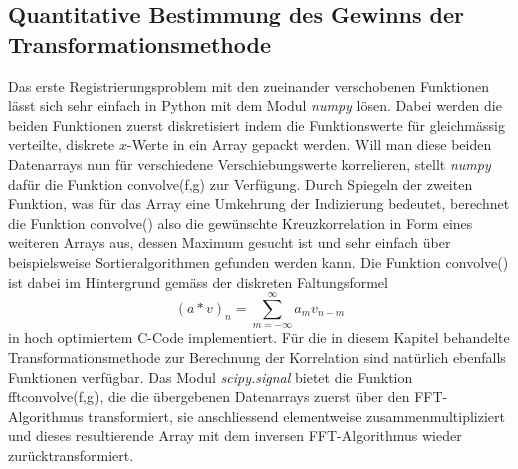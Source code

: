 \subsection{Quantitative Bestimmung des Gewinns der Transformationsmethode
\label{mellin:subsection:gewinn}}
Das erste Registrierungsproblem mit den zueinander verschobenen Funktionen 
lässt sich sehr einfach in Python mit dem Modul {\em numpy} lösen. 
Dabei werden die beiden Funktionen zuerst diskretisiert indem die Funktionswerte 
für gleichmässig verteilte, diskrete $x$-Werte in ein Array gepackt werden.
Will man diese beiden Datenarrays nun für verschiedene Verschiebungswerte 
korrelieren, stellt {\em numpy} dafür die Funktion convolve(f,g) zur 
Verfügung. 
Durch Spiegeln der zweiten Funktion, was für das Array eine Umkehrung der 
Indizierung bedeutet, berechnet die Funktion convolve() also die 
gewünschte Kreuzkorrelation in Form eines weiteren Arrays aus, dessen 
Maximum gesucht ist und sehr einfach über beispielsweise Sortieralgorithmen 
gefunden werden kann. 
Die Funktion convolve() ist dabei im Hintergrund gemäss der diskreten 
Faltungsformel
\[
    (a \ast v)_n = \sum_{m = -\infty}^{\infty} a_m v_{n-m}
\]
in hoch optimiertem C-Code implementiert.
Für die in diesem Kapitel behandelte Transformationsmethode zur Berechnung der 
Korrelation sind natürlich ebenfalls Funktionen verfügbar. 
Das Modul {\em scipy.signal} bietet die Funktion fftconvolve(f,g), die die 
übergebenen Datenarrays zuerst über den FFT-Algorithmus 
transformiert, sie anschliessend elementweise zusammenmultipliziert und dieses 
resultierende Array mit dem inversen FFT-Algorithmus wieder zurücktransformiert.

